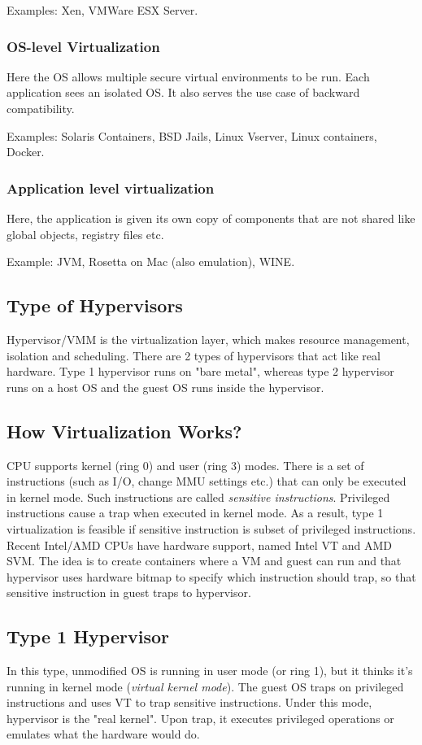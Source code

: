 \documentclass[twoside]{article}
\begin{document}
Examples: Xen, VMWare ESX Server.

\subsubsection{OS-level Virtualization}

Here the OS allows multiple secure virtual environments to be run. Each application sees an isolated OS. It also serves the use case of backward compatibility.

Examples: Solaris Containers, BSD Jails, Linux Vserver, Linux containers, Docker.

\subsubsection{Application level virtualization}
Here, the application is given its own copy of components that are not shared like global objects, registry files etc.

Example: JVM, Rosetta on Mac (also emulation), WINE.

\subsection{Type of Hypervisors}
Hypervisor/VMM is the virtualization layer, which makes resource management, isolation and scheduling. There are 2 types of hypervisors that act like real hardware. Type 1 hypervisor runs on "bare metal", whereas type 2 hypervisor runs on a host OS and the guest OS runs inside the hypervisor.

\subsection{How Virtualization Works?}
CPU supports kernel (ring 0) and user (ring 3) modes. There is a set of instructions (such as I/O, change MMU settings etc.) that can only be executed in kernel mode. Such instructions are called \textit{sensitive instructions}. Privileged instructions cause a trap when executed in kernel mode. As a result, type 1 virtualization is feasible if sensitive instruction is subset of privileged instructions. Recent Intel/AMD CPUs have hardware support, named Intel VT and AMD SVM. The idea is to create containers where a VM and guest can run and that hypervisor uses hardware bitmap to specify which instruction should trap, so that sensitive instruction in guest traps to hypervisor.

\subsection{Type 1 Hypervisor}
In this type, unmodified OS is running in user mode (or ring 1), but it thinks it's running in kernel mode (\textit{virtual kernel mode}). The guest OS traps on privileged instructions and uses VT to trap sensitive instructions. Under this mode, hypervisor is the "real kernel". Upon trap, it executes privileged operations or emulates what the hardware would do.
\end{document}
